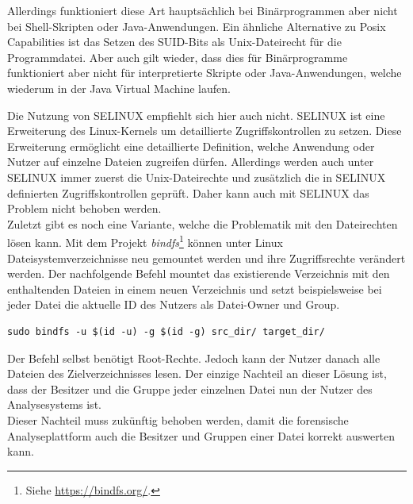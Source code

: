 \noindent
Allerdings funktioniert diese Art hauptsächlich bei Binärprogrammen aber nicht bei Shell-Skripten oder Java-Anwendungen. Ein ähnliche Alternative zu Posix Capabilities ist das Setzen des SUID-Bits als Unix-Dateirecht für die Programmdatei. Aber auch gilt wieder, dass dies für Binärprogramme funktioniert aber nicht für interpretierte Skripte oder Java-Anwendungen, welche wiederum in der Java Virtual Machine laufen.

Die Nutzung von SELINUX empfiehlt sich hier auch nicht. SELINUX ist eine Erweiterung des Linux-Kernels um detaillierte Zugriffskontrollen zu setzen. Diese Erweiterung ermöglicht eine detaillierte Definition, welche Anwendung oder Nutzer auf einzelne Dateien zugreifen dürfen. Allerdings werden auch unter SELINUX immer zuerst die Unix-Dateirechte und zusätzlich die in SELINUX definierten Zugriffskontrollen geprüft. Daher kann auch mit SELINUX das Problem nicht behoben werden.\\

\noindent
Zuletzt gibt es noch eine Variante, welche die Problematik mit den Dateirechten lösen kann. 
Mit dem Projekt \textit{bindfs}\footnote{Siehe \url{https://bindfs.org/}.} können unter Linux Dateisystemverzeichnisse neu gemountet werden und ihre Zugriffsrechte verändert werden. Der nachfolgende Befehl mountet das existierende Verzeichnis mit den enthaltenden Dateien in einem neuen Verzeichnis und setzt beispielsweise bei jeder Datei die aktuelle ID des Nutzers als Datei-Owner und Group. 
\begin{lstlisting}[label={lst:bindfs_command},caption= Nutzung von Bindfs zum Ändern von Dateirechten,captionpos=b,frame=single,style=customshell]
sudo bindfs -u $(id -u) -g $(id -g) src_dir/ target_dir/
\end{lstlisting}
Der Befehl selbst benötigt Root-Rechte. Jedoch kann der Nutzer danach alle Dateien des Zielverzeichnisses lesen. Der einzige Nachteil an dieser Lösung ist, dass der Besitzer und die Gruppe jeder einzelnen Datei nun der Nutzer des Analysesystems ist.\\
Dieser Nachteil muss zukünftig behoben werden, damit die forensische Analyseplattform auch die Besitzer und Gruppen einer Datei korrekt auswerten kann.
